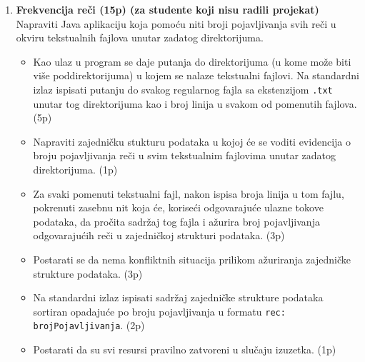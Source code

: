 \documentclass[]{article}
\begin{document}
\begin{enumerate}
\item \textbf{Frekvencija reči (15p) (za studente koji nisu radili projekat)}
\\Napraviti Java aplikaciju koja pomoću niti broji pojavljivanja svih reči u okviru tekstualnih fajlova unutar zadatog direktorijuma.
\begin{itemize}
  \item Kao ulaz u program se daje putanja do direktorijuma (u kome može biti vi\v{s}e poddirektorijuma) u kojem se nalaze tekstualni fajlovi. Na standardni izlaz ispisati putanju do svakog regularnog fajla sa ekstenzijom \texttt{.txt} unutar tog direktorijuma kao i broj linija u svakom od pomenutih fajlova. \hfill (5p)
  \item Napraviti zajedničku stukturu podataka u kojoj će se voditi evidencija o broju pojavljivanja re\v{c}i u svim tekstualnim fajlovima unutar zadatog direktorijuma. \hfill (1p)
  \item Za svaki pomenuti tekstualni fajl, nakon ispisa broja linija u tom fajlu, pokrenuti zasebnu nit koja će, korise\'c{}i odgovaraju\'c{}e ulazne tokove podataka, da pro\v{c}ita sadr\v{z}aj tog fajla i ažurira broj pojavljivanja odgovarajućih reči u zajedničkoj strukturi podataka. \hfill (3p)
  \item Postarati se da nema konfliktnih situacija prilikom ažuriranja zajedničke strukture podataka. \hfill (3p)
  \item Na standardni izlaz ispisati sadržaj zajedničke strukture podataka sortiran opadaju\'c{}e po broju pojavljivanja u formatu \texttt{rec: brojPojavljivanja}. \hfill (2p)
  \item Postarati da su svi resursi pravilno zatvoreni u slučaju izuzetka. \hfill (1p)
\end{itemize}

\end{enumerate}
\end{document}
